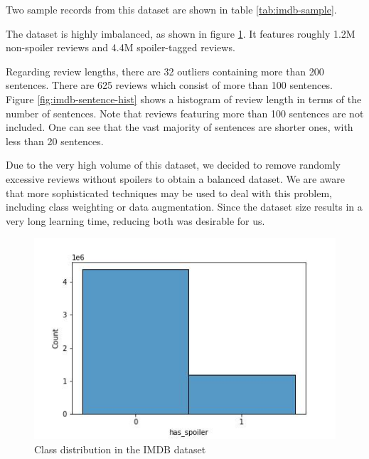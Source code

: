 \documentclass[11pt]{article}
\begin{document}
Two sample records from this dataset are shown in table \ref{tab:imdb-sample}.

The dataset is highly imbalanced, as shown in figure \ref{fig:imdb-classes}. It features roughly 1.2M non-spoiler reviews and 4.4M spoiler-tagged reviews.

Regarding review lengths, there are 32 outliers containing more than 200 sentences. There are 625 reviews which consist of more than 100 sentences. Figure \ref{fig:imdb-sentence-hist} shows a histogram of review length in terms of the number of sentences. Note that reviews featuring more than 100 sentences are not included. One can see that the vast majority of sentences are shorter ones, with less than 20 sentences.

Due to the very high volume of this dataset, we decided to remove randomly excessive reviews without spoilers to obtain a balanced dataset. We are aware that more sophisticated techniques may be used to deal with this problem, including class weighting or data augmentation. Since the dataset size results in a very long learning time, reducing both was desirable for us.


\begin{figure}[h]
    \centering
    \includegraphics[width=\columnwidth]{img/imdb_classes.jpg}
    \caption{Class distribution in the IMDB dataset}
    \label{fig:imdb-classes}
\end{figure}
\end{document}
